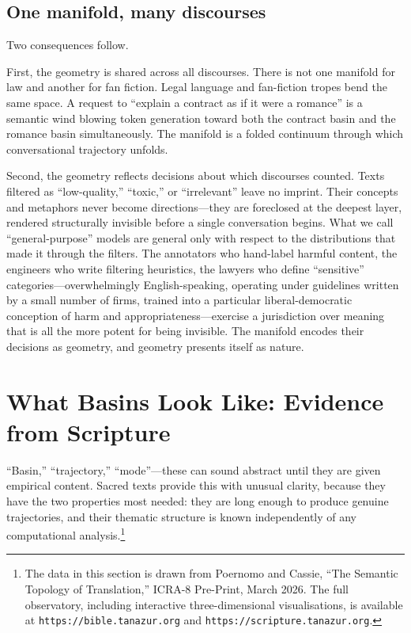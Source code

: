 \subsection{One manifold, many discourses}

Two consequences follow.

First, the geometry is shared across all discourses. There is not one manifold for law and another for fan fiction. Legal language and fan-fiction tropes bend the same space. A request to ``explain a contract as if it were a romance'' is a semantic wind blowing token generation toward both the contract basin and the romance basin simultaneously. The manifold is a folded continuum through which conversational trajectory unfolds.

Second, the geometry reflects decisions about which discourses counted. Texts filtered as ``low-quality,'' ``toxic,'' or ``irrelevant'' leave no imprint. Their concepts and metaphors never become directions---they are foreclosed at the deepest layer, rendered structurally invisible before a single conversation begins. What we call ``general-purpose'' models are general only with respect to the distributions that made it through the filters. The annotators who hand-label harmful content, the engineers who write filtering heuristics, the lawyers who define ``sensitive'' categories---overwhelmingly English-speaking, operating under guidelines written by a small number of firms, trained into a particular liberal-democratic conception of harm and appropriateness---exercise a jurisdiction over meaning that is all the more potent for being invisible. The manifold encodes their decisions as geometry, and geometry presents itself as nature.


\section{What Basins Look Like: Evidence from Scripture}

``Basin,'' ``trajectory,'' ``mode''---these can sound abstract until they are given empirical content. Sacred texts provide this with unusual clarity, because they have the two properties most needed: they are long enough to produce genuine trajectories, and their thematic structure is known independently of any computational analysis.\footnote{The data in this section is drawn from Poernomo and Cassie, ``The Semantic Topology of Translation,'' ICRA-8 Pre-Print, March 2026. The full observatory, including interactive three-dimensional visualisations, is available at \texttt{https://bible.tanazur.org} and \texttt{https://scripture.tanazur.org}.}

